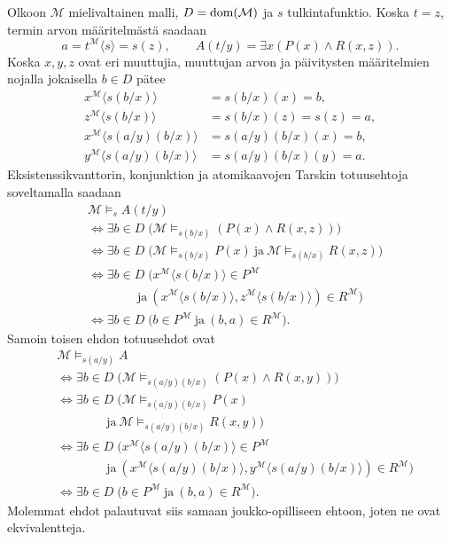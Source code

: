 \documentclass[11pt,a4paper]{amsart}
\begin{document}
\begin{solution}
  Olkoon \(\mathcal M\) mielivaltainen malli, \(D=\operatorname{dom}(\mathcal M)\)
  ja \(s\) tulkintafunktio. Koska \(t=z\), termin arvon määritelmästä
  saadaan
  \[
    a=t^{\mathcal M}\langle s\rangle=s(z),
    \qquad A(t/y)=\exists x(P(x)\land R(x,z)).
  \]
  Koska \(x,y,z\) ovat eri muuttujia, muuttujan arvon ja päivitysten
  määritelmien nojalla jokaisella \(b\in D\) pätee
  \[
    \begin{aligned}
      x^{\mathcal M}\langle s(b/x)\rangle
      &=s(b/x)(x)=b,\\
      z^{\mathcal M}\langle s(b/x)\rangle
      &=s(b/x)(z)=s(z)=a,\\
      x^{\mathcal M}\langle s(a/y)(b/x)\rangle
      &=s(a/y)(b/x)(x)=b,\\
      y^{\mathcal M}\langle s(a/y)(b/x)\rangle
      &=s(a/y)(b/x)(y)=a.
    \end{aligned}
  \]
  Eksistenssikvanttorin, konjunktion ja atomikaavojen Tarskin
  totuusehtoja soveltamalla saadaan
  \[
    \begin{aligned}
      &\mathcal M\models_s A(t/y)\\
      &\iff \exists b\in D\;\bigl(
      \mathcal M\models_{s(b/x)}(P(x)\land R(x,z))\bigr)\\
      &\iff \exists b\in D\;\bigl(
        \mathcal M\models_{s(b/x)}P(x)\ \text{ja}\
      \mathcal M\models_{s(b/x)}R(x,z)\bigr)\\
      &\iff \exists b\in D\;\bigl(
        x^{\mathcal M}\langle s(b/x)\rangle\in P^{\mathcal M}\\
        &\qquad\qquad\text{ja}\
        (x^{\mathcal M}\langle s(b/x)\rangle,
      z^{\mathcal M}\langle s(b/x)\rangle)\in R^{\mathcal M}\bigr)\\
      &\iff \exists b\in D\;\bigl(
      b\in P^{\mathcal M}\ \text{ja}\ (b,a)\in R^{\mathcal M}\bigr).
    \end{aligned}
  \]
  Samoin toisen ehdon totuusehdot ovat
  \[
    \begin{aligned}
      &\mathcal M\models_{s(a/y)} A\\
      &\iff \exists b\in D\;\bigl(
      \mathcal M\models_{s(a/y)(b/x)}(P(x)\land R(x,y))\bigr)\\
      &\iff \exists b\in D\;\bigl(
        \mathcal M\models_{s(a/y)(b/x)}P(x)\\
        &\qquad\qquad\text{ja}\
      \mathcal M\models_{s(a/y)(b/x)}R(x,y)\bigr)\\
      &\iff \exists b\in D\;\bigl(
        x^{\mathcal M}\langle s(a/y)(b/x)\rangle\in P^{\mathcal M}\\
        &\qquad\qquad\text{ja}\
        (x^{\mathcal M}\langle s(a/y)(b/x)\rangle,
        y^{\mathcal M}\langle s(a/y)(b/x)\rangle)
      \in R^{\mathcal M}\bigr)\\
      &\iff \exists b\in D\;\bigl(
      b\in P^{\mathcal M}\ \text{ja}\ (b,a)\in R^{\mathcal M}\bigr).
    \end{aligned}
  \]
  Molemmat ehdot palautuvat siis samaan joukko-opilliseen ehtoon,
  joten ne ovat ekvivalentteja.\qedhere
\end{solution}
\end{document}
